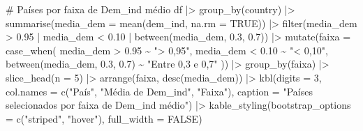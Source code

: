 \documentclass[
  portuguese,
  letterpaper,
  DIV=11,
  numbers=noendperiod]{scrartcl}
\newenvironment{Shaded}{\begin{snugshade}}{\end{snugshade}}
\newcommand{\AttributeTok}[1]{\textcolor[rgb]{0.40,0.45,0.13}{#1}}
\newcommand{\CommentTok}[1]{\textcolor[rgb]{0.37,0.37,0.37}{#1}}
\newcommand{\ConstantTok}[1]{\textcolor[rgb]{0.56,0.35,0.01}{#1}}
\newcommand{\DecValTok}[1]{\textcolor[rgb]{0.68,0.00,0.00}{#1}}
\newcommand{\FloatTok}[1]{\textcolor[rgb]{0.68,0.00,0.00}{#1}}
\newcommand{\FunctionTok}[1]{\textcolor[rgb]{0.28,0.35,0.67}{#1}}
\newcommand{\NormalTok}[1]{\textcolor[rgb]{0.00,0.23,0.31}{#1}}
\newcommand{\SpecialCharTok}[1]{\textcolor[rgb]{0.37,0.37,0.37}{#1}}
\newcommand{\StringTok}[1]{\textcolor[rgb]{0.13,0.47,0.30}{#1}}
\begin{document}
\begin{Shaded}
\begin{Highlighting}[]
\CommentTok{\# Países por faixa de Dem\_ind médio}
\NormalTok{df }\SpecialCharTok{|\textgreater{}}
  \FunctionTok{group\_by}\NormalTok{(country) }\SpecialCharTok{|\textgreater{}}
  \FunctionTok{summarise}\NormalTok{(}\AttributeTok{media\_dem =} \FunctionTok{mean}\NormalTok{(dem\_ind, }\AttributeTok{na.rm =} \ConstantTok{TRUE}\NormalTok{)) }\SpecialCharTok{|\textgreater{}}
  \FunctionTok{filter}\NormalTok{(media\_dem }\SpecialCharTok{\textgreater{}} \FloatTok{0.95} \SpecialCharTok{|}\NormalTok{ media\_dem }\SpecialCharTok{\textless{}} \FloatTok{0.10} \SpecialCharTok{|} \FunctionTok{between}\NormalTok{(media\_dem, }\FloatTok{0.3}\NormalTok{, }\FloatTok{0.7}\NormalTok{)) }\SpecialCharTok{|\textgreater{}}
  \FunctionTok{mutate}\NormalTok{(}\AttributeTok{faixa =} \FunctionTok{case\_when}\NormalTok{(}
\NormalTok{    media\_dem }\SpecialCharTok{\textgreater{}} \FloatTok{0.95}            \SpecialCharTok{\textasciitilde{}} \StringTok{"\textgreater{} 0,95"}\NormalTok{,}
\NormalTok{    media\_dem }\SpecialCharTok{\textless{}} \FloatTok{0.10}            \SpecialCharTok{\textasciitilde{}} \StringTok{"\textless{} 0,10"}\NormalTok{,}
    \FunctionTok{between}\NormalTok{(media\_dem, }\FloatTok{0.3}\NormalTok{, }\FloatTok{0.7}\NormalTok{) }\SpecialCharTok{\textasciitilde{}} \StringTok{"Entre 0,3 e 0,7"}
\NormalTok{  )) }\SpecialCharTok{|\textgreater{}}
  \FunctionTok{group\_by}\NormalTok{(faixa) }\SpecialCharTok{|\textgreater{}}
  \FunctionTok{slice\_head}\NormalTok{(}\AttributeTok{n =} \DecValTok{5}\NormalTok{) }\SpecialCharTok{|\textgreater{}}
  \FunctionTok{arrange}\NormalTok{(faixa, }\FunctionTok{desc}\NormalTok{(media\_dem)) }\SpecialCharTok{|\textgreater{}}
  \FunctionTok{kbl}\NormalTok{(}\AttributeTok{digits =} \DecValTok{3}\NormalTok{,}
      \AttributeTok{col.names =} \FunctionTok{c}\NormalTok{(}\StringTok{"País"}\NormalTok{, }\StringTok{"Média de Dem\_ind"}\NormalTok{, }\StringTok{"Faixa"}\NormalTok{),}
      \AttributeTok{caption =} \StringTok{"Países selecionados por faixa de Dem\_ind médio"}\NormalTok{) }\SpecialCharTok{|\textgreater{}}
  \FunctionTok{kable\_styling}\NormalTok{(}\AttributeTok{bootstrap\_options =} \FunctionTok{c}\NormalTok{(}\StringTok{"striped"}\NormalTok{, }\StringTok{"hover"}\NormalTok{), }\AttributeTok{full\_width =} \ConstantTok{FALSE}\NormalTok{)}
\end{Highlighting}
\end{Shaded}
\end{document}
